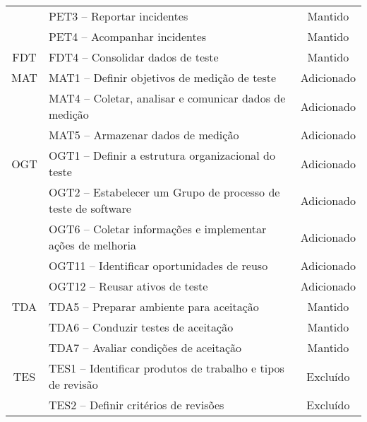 \begin{table}[!ht]
{\begin{tabular}{|l|l|l|}
    \cline{2-3}
    \multicolumn{1}{|c|}{} & PET3 – Reportar incidentes & \multicolumn{1}{c|}{Mantido} \\ 
    \cline{2-3}
    \multicolumn{1}{|c|}{} & PET4 – Acompanhar incidentes & \multicolumn{1}{c|}{Mantido} \\ 
    \hline
    \multicolumn{1}{|c|}{FDT} & FDT4 – Consolidar dados de teste & \multicolumn{1}{c|}{Mantido} \\ 
    \hline
    \multicolumn{1}{|c|}{MAT} & MAT1 – Definir objetivos de medição de teste & \multicolumn{1}{c|}{Adicionado} \\ 
    \cline{2-3}
    \multicolumn{1}{|c|}{} & MAT4 – Coletar, analisar e comunicar dados de medição & \multicolumn{1}{c|}{Adicionado} \\ 
    \cline{2-3}
    \multicolumn{1}{|c|}{} & MAT5 – Armazenar dados de medição & \multicolumn{1}{c|}{Adicionado} \\ 
    \hline
    \multicolumn{1}{|c|}{OGT} & OGT1 – Definir a estrutura organizacional do teste & \multicolumn{1}{c|}{Adicionado} \\ 
    \cline{2-3}
    \multicolumn{1}{|c|}{} & OGT2 – Estabelecer um Grupo de processo de teste de software & \multicolumn{1}{c|}{Adicionado} \\ 
    \cline{2-3}
    \multicolumn{1}{|c|}{} & OGT6 – Coletar informações e implementar ações de melhoria & \multicolumn{1}{c|}{Adicionado} \\ 
    \cline{2-3}
    \multicolumn{1}{|c|}{} & OGT11 – Identificar oportunidades de reuso & \multicolumn{1}{c|}{Adicionado} \\ 
    \cline{2-3}
    \multicolumn{1}{|c|}{} & OGT12 – Reusar ativos de teste & \multicolumn{1}{c|}{Adicionado} \\ 
    \hline
    \multicolumn{1}{|c|}{TDA} & TDA5 – Preparar ambiente para aceitação & \multicolumn{1}{c|}{Mantido} \\ 
    \cline{2-3}
    \multicolumn{1}{|c|}{} & TDA6 – Conduzir testes de aceitação & \multicolumn{1}{c|}{Mantido} \\ 
    \cline{2-3}
    \multicolumn{1}{|c|}{} & TDA7 – Avaliar condições de aceitação & \multicolumn{1}{c|}{Mantido} \\ 
    \hline
    \multicolumn{1}{|c|}{TES} & TES1 – Identificar produtos de trabalho e tipos de revisão & \multicolumn{1}{c|}{Excluído} \\ 
    \cline{2-3}
    \multicolumn{1}{|c|}{} & TES2 – Definir critérios de revisões & \multicolumn{1}{c|}{Excluído} \\ 

\end{tabular}}
\end{table}
